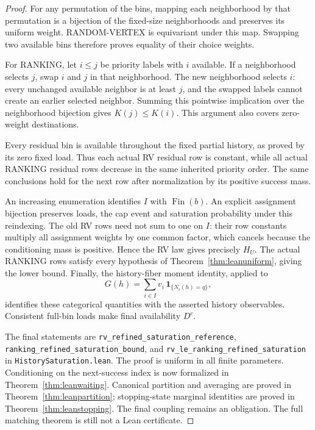 \documentclass[11pt]{article}
\begin{document}
\begin{proof}
For any permutation of the bins, mapping each neighborhood by that
permutation is a bijection of the fixed-size neighborhoods and preserves
its uniform weight. RANDOM-VERTEX is equivariant under this map. Swapping
two available bins therefore proves equality of their choice weights.

For RANKING, let $i\leq j$ be priority labels with $i$ available. If a
neighborhood selects $j$, swap $i$ and $j$ in that neighborhood. The new
neighborhood selects $i$: every unchanged available neighbor is at least
$j$, and the swapped labels cannot create an earlier selected neighbor.
Summing this pointwise implication over the neighborhood bijection gives
$K(j)\leq K(i)$. This argument also covers zero-weight destinations.

Every residual bin is available throughout the fixed partial history,
as proved by its zero fixed load. Thus each actual RV residual row is
constant, while all actual RANKING residual rows decrease in the same
inherited priority order. The same conclusions hold for the next row
after normalization by its positive success mass.

An increasing enumeration identifies $I$ with $\operatorname{Fin}(b)$.
An explicit assignment bijection preserves loads, the cap event and
saturation probability under this reindexing. The old RV rows need not
sum to one on $I$: their row constants multiply all assignment weights
by one common factor, which cancels because the conditioning mass is
positive. Hence the RV law gives precisely $H_U$. The actual RANKING rows
satisfy every hypothesis of Theorem~\ref{thm:leanuniform}, giving the lower
bound. Finally, the history-fiber moment identity, applied to
\[
 G(h)=\sum_{i\in I}v_i\,\mathbf1_{\{N_i(h)=q\}},
\]
identifies these categorical quantities with the asserted history
observables. Consistent full-bin loads make final availability $D^c$.

The final statements are
\texttt{rv\_refined\_saturation\_reference},
\texttt{ranking\_refined\_saturation\_bound}, and
\texttt{rv\_le\_ranking\_refined\_saturation} in
\texttt{HistorySaturation.lean}. The proof is uniform in all finite
parameters. Conditioning on the next-success index is now formalized in
Theorem~\ref{thm:leanwaiting}. Canonical partition and averaging are
proved in Theorem~\ref{thm:leanpartition}; stopping-state marginal
identities are proved in Theorem~\ref{thm:leanstopping}. The final
coupling remains an obligation.
The full matching theorem is still not a Lean certificate.
\end{proof}
\end{document}
